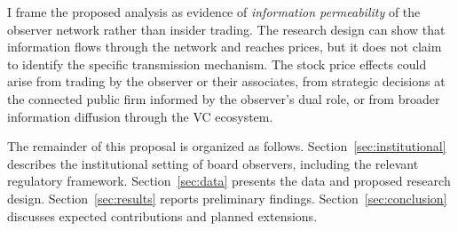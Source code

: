 I frame the proposed analysis as evidence of \textit{information permeability} of the observer network rather than insider trading. The research design can show that information flows through the network and reaches prices, but it does not claim to identify the specific transmission mechanism. The stock price effects could arise from trading by the observer or their associates, from strategic decisions at the connected public firm informed by the observer's dual role, or from broader information diffusion through the VC ecosystem.

The remainder of this proposal is organized as follows. Section~\ref{sec:institutional} describes the institutional setting of board observers, including the relevant regulatory framework. Section~\ref{sec:data} presents the data and proposed research design. Section~\ref{sec:results} reports preliminary findings. Section~\ref{sec:conclusion} discusses expected contributions and planned extensions.